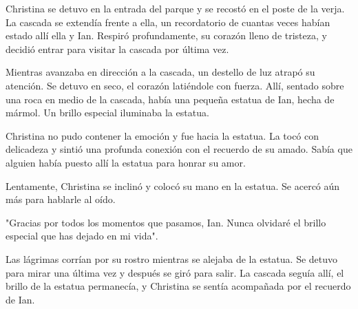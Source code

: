 

Christina se detuvo en la entrada del parque y se recostó en el poste de la verja. La cascada se extendía frente a ella, un recordatorio de cuantas veces habían estado allí ella y Ian. Respiró profundamente, su corazón lleno de tristeza, y decidió entrar para visitar la cascada por última vez.

Mientras avanzaba en dirección a la cascada, un destello de luz atrapó su atención. Se detuvo en seco, el corazón latiéndole con fuerza. Allí, sentado sobre una roca en medio de la cascada, había una pequeña estatua de Ian, hecha de mármol. Un brillo especial iluminaba la estatua.

Christina no pudo contener la emoción y fue hacia la estatua. La tocó con delicadeza y sintió una profunda conexión con el recuerdo de su amado. Sabía que alguien había puesto allí la estatua para honrar su amor.

Lentamente, Christina se inclinó y colocó su mano en la estatua. Se acercó aún más para hablarle al oído.

"Gracias por todos los momentos que pasamos, Ian. Nunca olvidaré el brillo especial que has dejado en mi vida".

Las lágrimas corrían por su rostro mientras se alejaba de la estatua. Se detuvo para mirar una última vez y después se giró para salir. La cascada seguía allí, el brillo de la estatua permanecía, y Christina se sentía acompañada por el recuerdo de Ian.